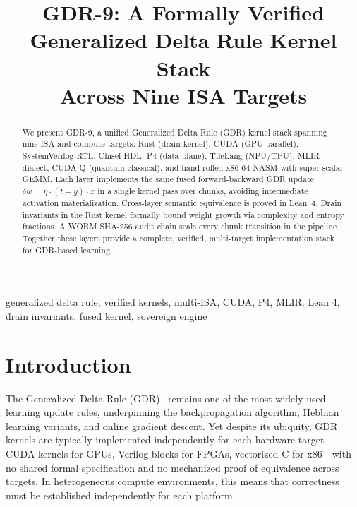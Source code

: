 \documentclass[10pt,conference]{IEEEtran}
\begin{document}
\title{GDR-9: A Formally Verified Generalized Delta Rule Kernel Stack\\Across Nine ISA Targets}

\author{
  \and
}

\maketitle

\begin{abstract}
We present GDR-9, a unified Generalized Delta Rule (GDR) kernel stack spanning
nine ISA and compute targets: Rust (drain kernel), CUDA (GPU parallel), SystemVerilog
RTL, Chisel HDL, P4 (data plane), TileLang (NPU/TPU), MLIR dialect, CUDA-Q
(quantum-classical), and hand-rolled x86-64 NASM with super-scalar GEMM. Each
layer implements the same fused forward-backward GDR update
$\delta w = \eta \cdot (t - y) \cdot x$ in a single kernel pass over chunks,
avoiding intermediate activation materialization. Cross-layer semantic equivalence
is proved in Lean~4. Drain invariants in the Rust kernel formally bound weight
growth via complexity and entropy fractions. A WORM SHA-256 audit chain seals
every chunk transition in the pipeline. Together these layers provide a
complete, verified, multi-target implementation stack for GDR-based learning.
\end{abstract}

\begin{IEEEkeywords}
generalized delta rule, verified kernels, multi-ISA, CUDA, P4, MLIR,
Lean 4, drain invariants, fused kernel, sovereign engine
\end{IEEEkeywords}


\section{Introduction}

The Generalized Delta Rule (GDR)~\cite{widrow1960adaline} remains one of the
most widely used learning update rules, underpinning the backpropagation
algorithm, Hebbian learning variants, and online gradient descent. Yet despite
its ubiquity, GDR kernels are typically implemented independently for each
hardware target---CUDA kernels for GPUs, Verilog blocks for FPGAs, vectorized C
for x86---with no shared formal specification and no mechanized proof of
equivalence across targets. In heterogeneous compute environments, this means
that correctness must be established independently for each platform.
\end{document}
